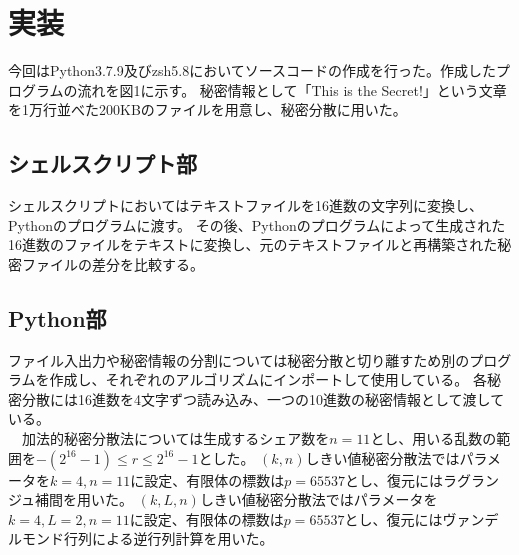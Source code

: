 \documentclass[twocolumn,a4paper]{jsarticle}
\begin{document}
	\section{実装}
	今回はPython3.7.9及びzsh5.8においてソースコードの作成を行った。作成したプログラムの流れを図1に示す。
	秘密情報として「This is the Secret!」という文章を1万行並べた200KBのファイルを用意し、秘密分散に用いた。
	\subsection{シェルスクリプト部}
	シェルスクリプトにおいてはテキストファイルを16進数の文字列に変換し、Pythonのプログラムに渡す。
	その後、Pythonのプログラムによって生成された16進数のファイルをテキストに変換し、元のテキストファイルと再構築された秘密ファイルの差分を比較する。
	\subsection{Python部}
	ファイル入出力や秘密情報の分割については秘密分散と切り離すため別のプログラムを作成し、それぞれのアルゴリズムにインポートして使用している。
	各秘密分散には16進数を4文字ずつ読み込み、一つの10進数の秘密情報として渡している。 \\
	　加法的秘密分散法については生成するシェア数を$n=11$とし、用いる乱数の範囲を$-(2^{16}-1){\leq}r{\leq}2^{16}-1$とした。
	$(k,n)$しきい値秘密分散法ではパラメータを$k=4,n=11$に設定、有限体の標数は$p=65537$とし、復元にはラグランジュ補間を用いた。
	$(k,L,n)$しきい値秘密分散法ではパラメータを$k=4,L=2,n=11$に設定、有限体の標数は$p=65537$とし、復元にはヴァンデルモンド行列による逆行列計算を用いた。
\end{document}

